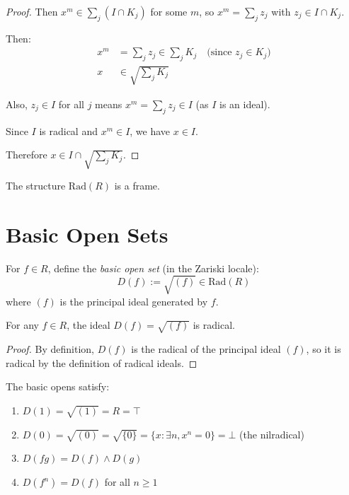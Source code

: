 \begin{proof}
  Then $x^m \in \sum_j (I \cap K_j)$ for some $m$, so $x^m = \sum_j z_j$ with $z_j \in I \cap K_j$.
  
  Then:
  \begin{align*}
    x^m &= \sum_j z_j \in \sum_j K_j \quad \text{(since } z_j \in K_j \text{)} \\
    x &\in \sqrt{\sum_j K_j}
  \end{align*}
  
  Also, $z_j \in I$ for all $j$ means $x^m = \sum_j z_j \in I$ (as $I$ is an ideal).
  
  Since $I$ is radical and $x^m \in I$, we have $x \in I$.
  
  Therefore $x \in I \cap \sqrt{\sum_j K_j}$.
\end{proof}

\begin{corollary}
  \label{cor:radical-frame}
  \leanok
  The structure $\mathrm{Rad}(R)$ is a frame.
\end{corollary}

\section{Basic Open Sets}

\begin{definition}
  \label{def:basic-open-set}
  \leanok
  For $f \in R$, define the \emph{basic open set} (in the Zariski locale):
  $$D(f) := \sqrt{(f)} \in \mathrm{Rad}(R)$$
  where $(f)$ is the principal ideal generated by $f$.
\end{definition}

\begin{lemma}
  \label{lemma:basic-open-radical}
  \leanok
  For any $f \in R$, the ideal $D(f) = \sqrt{(f)}$ is radical.
\end{lemma}

\begin{proof}
  \leanok
  By definition, $D(f)$ is the radical of the principal ideal $(f)$, so it is radical by the definition of radical ideals.
\end{proof}

\begin{lemma}
  \label{lemma:basic-open-properties}
  \leanok
  The basic opens satisfy:
  \begin{enumerate}
    \item $D(1) = \sqrt{(1)} = R = \top$
    \item $D(0) = \sqrt{(0)} = \sqrt{\{0\}} = \{x : \exists n, x^n = 0\} = \bot$ (the nilradical)
    \item $D(fg) = D(f) \land D(g)$
    \item $D(f^n) = D(f)$ for all $n \geq 1$
  \end{enumerate}
\end{lemma}

